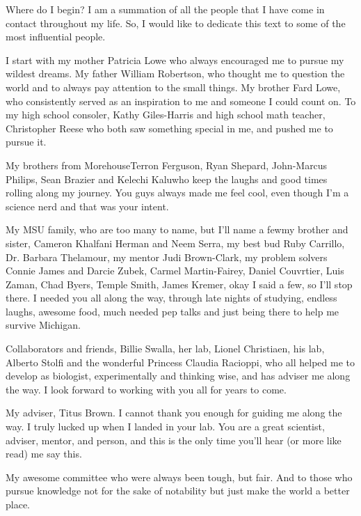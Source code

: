 Where do I begin? I am a summation of all the people that I have come in contact throughout my life. So, I would like to dedicate this text to some of the most influential people. 

I start with my mother Patricia Lowe who always encouraged me to pursue my wildest dreams. My father William Robertson, who thought me to question the world and to always pay attention to the small things. My brother Fard Lowe, who consistently served as an inspiration to me and someone I could count on. To my high school consoler, Kathy Giles-Harris and high school math teacher, Christopher Reese who both saw something special in me, and pushed me to pursue it. 

My brothers from Morehouse\textemdash Terron Ferguson, Ryan Shepard, John-Marcus Philips, Sean Brazier and Kelechi Kalu\textemdash who keep the laughs and good times rolling along my journey. You guys always made me feel cool, even though I'm a science nerd and that was your intent.
  
My MSU family, who are too many to name, but I'll name a few\textemdash my brother and sister, Cameron Khalfani Herman and Neem Serra, my best bud Ruby Carrillo, Dr. Barbara Thelamour, my mentor Judi Brown-Clark, my problem solvers Connie James and Darcie Zubek, Carmel Martin-Fairey, Daniel Couvrtier, Luis Zaman, Chad Byers, Temple Smith, James Kremer, okay I said a few, so I'll stop there. I needed you all along the way, through late nights of studying, endless laughs, awesome food, much needed pep talks and just being there to help me survive Michigan.

Collaborators and friends, Billie Swalla, her lab, Lionel Christiaen, his lab, Alberto Stolfi and the wonderful Princess Claudia Racioppi, who all helped me to develop as biologist, experimentally and thinking wise, and has adviser me along the way. I look forward to working with you all for years to come. 

My adviser, Titus Brown. I cannot thank you enough for guiding me along the way. I truly lucked up when I landed in your lab. You are a great scientist, adviser, mentor, and person, and this is the only time you'll hear (or more like read) me say this.

My awesome committee who were always been tough, but fair.
And to those who pursue knowledge not for the sake of notability but just make the world a better place.